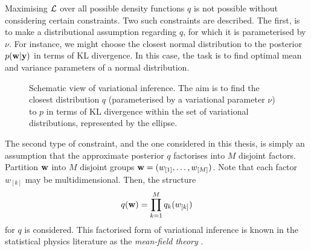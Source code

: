 Maximising ${\mathcal L}$ over all possible density functions $q$ is not possible without considering certain constraints.
Two such constraints are described. 
The first, is to make a distributional assumption regarding $q$, for which it is parameterised by $\nu$.
For instance, we might choose the closest normal distribution to the posterior $p({\mathbf w}|{\mathbf y})$ in terms of KL divergence.
In this case, the task is to find optimal mean and variance parameters of a normal distribution.

\begin{figure}[htb]
  \centering
  \vspace{-1em}
  \caption[Schematic view of variational inference. The aim is to find the closest distribution $q$ (parameterised by a variational parameter $\nu$) to $p$ in terms of KL divergence within the set of variational distributions, represented by the ellipse.]{Schematic view of variational inference\footnotemark. The aim is to find the closest distribution $q$ (parameterised by a variational parameter $\nu$) to $p$ in terms of KL divergence within the set of variational distributions, represented by the ellipse.}
\end{figure}

The second type of constraint, and the one considered in this thesis, is simply an assumption that the approximate posterior $q$ factorises into $M$ disjoint factors.
Partition ${\mathbf w}$ into $M$ disjoint groups ${\mathbf w} = (w_{[1]},\dots,w_{[M]})$.
Note that each factor $w_{[k]}$ may be multidimensional.
Then, the structure
\[
  q({\mathbf w}) = \prod_{k=1}^M q_k(w_{[k]})
\]
for $q$ is considered.
This factorised form of variational inference is known in the statistical physics literature as the \emph{mean-field theory} \citep{itzykson1991statistical}.

